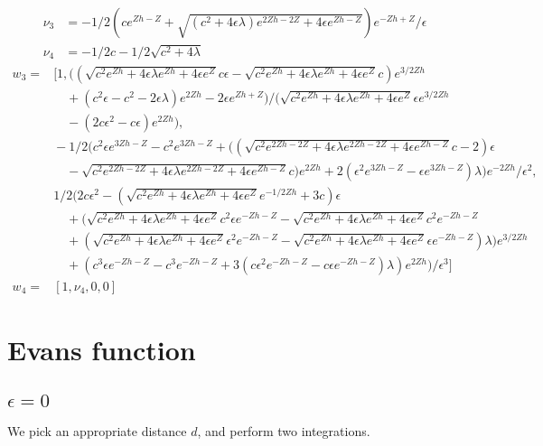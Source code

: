 \documentclass[10pt]{article}
\begin{document}
\begin{align*}
    \nu_3 &=-1/2 \left(c e^{Z h - Z} + \sqrt{(c^2 + 4 \epsilon \lambda) e^{2 Z h - 2 Z} +
4 \epsilon e^{Z h - Z}}\right) e^{-Z h + Z}/\epsilon
\\
    \nu_4 &= -1/2 c - 1/2 \sqrt{c^2 + 4 \lambda}
\end{align*}
\begin{align*}
    w_3 =& [1, ((\sqrt{c^2 e^{Z h} +
4 \epsilon \lambda e^{Z h} + 4 \epsilon e^Z} c \epsilon - \sqrt{c^2 e^{Z h} +
4 \epsilon \lambda e^{Z h} + 4 \epsilon e^Z} c) e^{3/2 Z h} \\
& \quad + (c^2 \epsilon - c^2 -
2 \epsilon \lambda) e^{2 Z h} - 2 \epsilon e^{Z h + Z})/(\sqrt{c^2 e^{Z h} +
4 \epsilon \lambda e^{Z h} + 4 \epsilon e^Z} \epsilon e^{3/2 Z h} \\
& \quad - (2 c \epsilon^2 -
    c \epsilon) e^{2 Z h}), \\
    &\!-1/2 (c^2 \epsilon e^{3 Z h - Z} - c^2 e^{3 Z h - Z} +
    ((\sqrt{c^2 e^{2 Z h - 2 Z} + 4 \epsilon \lambda e^{2 Z h - 2 Z} + 4 \epsilon e^{Z h
    - Z}} c - 2) \epsilon \\
    & \quad - \sqrt{c^2 e^{2 Z h - 2 Z} + 4 \epsilon \lambda e^{2 Z h -
    2 Z} + 4 \epsilon e^{Z h - Z}} c) e^{2 Z h} + 2 (\epsilon^2 e^{3 Z h - Z} -
    \epsilon e^{3 Z h - Z}) \lambda) e^{-2 Z h}/\epsilon^2, \\
    & 1/2 (2 c \epsilon^2 -
    (\sqrt{c^2 e^{Z h} + 4 \epsilon \lambda e^{Z h} + 4 \epsilon e^Z} e^{-1/2 Z h} +
    3 c) \epsilon \\
    & \quad + (\sqrt{c^2 e^{Z h} + 4 \epsilon \lambda e^{Z h} +
    4 \epsilon e^Z} c^2 \epsilon e^{-Z h - Z} - \sqrt{c^2 e^{Z h} + 4 \epsilon \lambda e^{Z h}
    + 4 \epsilon e^Z} c^2 e^{-Z h - Z} \\ 
    & \quad + (\sqrt{c^2 e^{Z h} + 4 \epsilon \lambda e^{Z h}
    + 4 \epsilon e^Z} \epsilon^2 e^{-Z h - Z} - \sqrt{c^2 e^{Z h} + 4 \epsilon \lambda e^{Z h}
    + 4 \epsilon e^Z} \epsilon e^{-Z h - Z}) \lambda) e^{3/2 Z h} \\
    & \quad + (c^3 \epsilon e^{-Z h -
    Z} - c^3 e^{-Z h - Z} + 3 (c \epsilon^2 e^{-Z h - Z} - c \epsilon e^{-Z h -
Z}) \lambda) e^{2 Z h})/\epsilon^3]
\\
w_4 =& [1, \nu_4, 0, 0]
\end{align*}

\section{Evans function}
\subsection{$\epsilon = 0$}
We pick an appropriate distance $d$, and perform two integrations.
\end{document}

